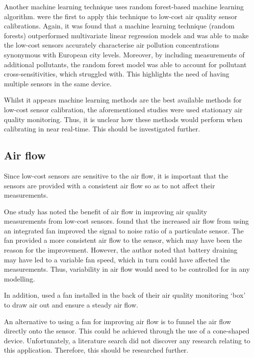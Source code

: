 \documentclass[11pt]{report}
\begin{document}
Another machine learning technique uses random forest-based machine learning algorithm. \cite{zimmerman2018machinelearning} were the first to apply this technique to low-cost air quality sensor calibrations. Again, it was found that a machine learning technique (random forests) outperformed multivariate linear regression models and was able to make the low-cost sensors accurately characterise air pollution concentrations synonymous with European city levels. Moreover, by including measurements of additional pollutants, the random forest model was able to account for pollutant cross-sensitivities, which \cite{Spinelle2015fieldcalibrationa,Spinelle2017fieldcalibrationb} struggled with. This highlights the need of having multiple sensors in the same device.

Whilst it appears machine learning methods are the best available methods for low-cost sensor calibration, the aforementioned studies were used stationary air quality monitoring. Thus, it is unclear how these methods would perform when calibrating in near real-time. This should be investigated further.



\subsection{Air flow} \label{air_flow}

Since low-cost sensors are sensitive to the air flow, it is important that the sensors are provided with a consistent air flow so as to not affect their measurements.

One study has noted the benefit of air flow in improving air quality measurements from low-cost sensors. \cite{thorpe2017RPimesh} found that the increased air flow from using an integrated fan improved the signal to noise ratio of a particulate sensor. The fan provided a more consistent air flow to the sensor, which may have been the reason for the improvement. However, the author noted that battery draining may have led to a variable fan speed, which in turn could have affected the measurements. Thus, variability in air flow would need to be controlled for in any modelling.

In addition, \cite{Hasenfratz2015highresmapsTram} used a fan installed in the back of their air quality monitoring `box' to draw air out and ensure a steady air flow.

An alternative to using a fan for improving air flow is to funnel the air flow directly onto the sensor. This could be achieved through the use of a cone-shaped device. Unfortunately, a literature search did not discover any research relating to this application. Therefore, this should be researched further.
\end{document}
